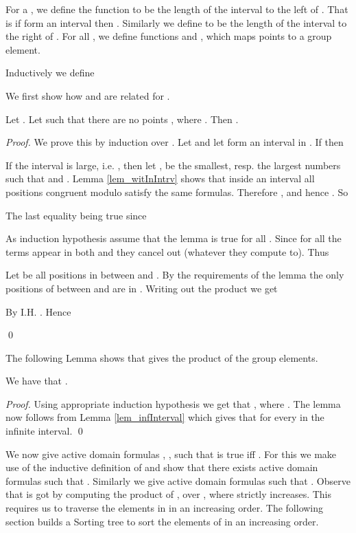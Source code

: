 \documentclass[envcountsame]{llncs}
\begin{document}
For a , we define the function  to be the length of the interval to the left of . That is if  form an interval then . Similarly we define  to be the length of the interval to the right of . For all , we define functions  and , which maps points  to a group element. 




Inductively we define



\noindent We first show how  and  are related for .
\begin{lemma} Let .
Let  such that there are no points , where . Then
.
\end{lemma}
\begin{proof}
We prove this by induction over .
Let  and let  form an interval in . If  then 


If the interval is large, i.e. , then let , be the smallest, resp. the largest numbers such that  and .
Lemma \ref{lem_witInIntrv} shows that inside an interval all positions congruent modulo  satisfy the same formulas. Therefore , and hence . So 

The last equality being true since 

As induction hypothesis assume that the lemma is true for all .
Since for all  the terms  appear in both  and  
they cancel out (whatever they compute to). Thus 


Let  be all positions in  between  and . By the requirements of the lemma the only positions of 
between  and  are in . Writing out the product we get 

By I.H.  . Hence

\qed \end{proof}

The following Lemma shows that  gives the product of the group elements.
\begin{lemma}\label{lem_whattocomp}
We have that .
\end{lemma}
\begin{proof}
Using appropriate induction hypothesis we get that , where . The lemma now follows from Lemma \ref{lem_infInterval} which gives that  for every  in the infinite interval.
\qed \end{proof}

We now give active domain formulas , , such that  is true iff . For this we make use of the
inductive definition of  and show that there exists active domain formulas  such that .
Similarly we give active domain formulas  such that .
Observe that  is got by computing the product of 
, over , where  strictly increases. This requires us to traverse the elements in  in an increasing order. The following section builds a Sorting tree to sort the elements of  in an increasing order.
\end{document}
